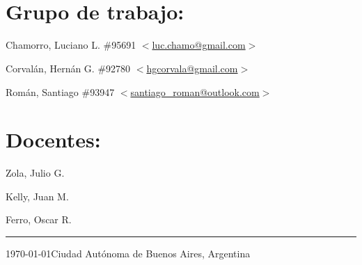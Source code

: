 \begin{titlepage}
\begin{center}

\LARGE{\textsc{\underline{\universidad}}}\\[.6\baselineskip]
\Large{\textsc{\facultad}}\\[.6\baselineskip]
\large{\cuatri}

\end{center}

\vfill

\section*{Grupo de trabajo:}

\teammember
{Chamorro, Luciano L. \#95691}
{\href{mailto:luc.chamo@gmail.com}{$<$luc.chamo@gmail.com$>$}}

\teammember
{Corvalán, Hernán G. \#92780}
{\href{mailto:hgcorvala@gmail.com}{$<$hgcorvala@gmail.com$>$}}

\teammember
{Román, Santiago \#93947}
{\href{mailto:santiago_roman@outlook.com}{$<$santiago\_roman@outlook.com$>$}}


\section*{Docentes:}

\teammember
{Zola, Julio G.}
{}{}


\teammember
{Kelly, Juan M.}
{}{}

\teammember
{Ferro, Oscar R.}
{}{}




\vfill

\vspace{1cm}
\hrule
\vspace{0.2cm}

\noindent\small{\today \hfill Ciudad Autónoma de Buenos Aires, Argentina}

\end{titlepage}
\restoregeometry